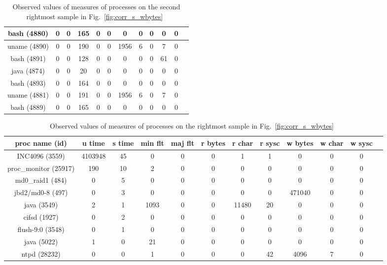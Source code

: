 \begin{table}[h]
\begin{center}
\begin{tabular}{|c|c|c|c|c|c|c|c|c|c|c|c|}
bash (4880) & 0 & 0 & 165 & 0 & 0 & 0 & 0 & 0 & 0 & 0 \\ \hline
uname (4890)  & 0 & 0 & 190 & 0 & 0 & 1956  & 6 & 0 & 7 & 0 \\ \hline
bash (4891) & 0 & 0 & 128 & 0 & 0 & 0 & 0 & 0 & 61 & 0 \\ \hline
java  (4874) & 0 & 0 & 20 & 0 & 0 & 0 & 0 & 0 & 0 & 0 \\ \hline
bash (4893) & 0 & 0 & 164 & 0 & 0 & 0 & 0 & 0 & 0 & 0 \\ \hline
uname (4881)  & 0 & 0 & 191 & 0 & 0 & 1956  & 6 & 0 & 7 & 0 \\ \hline
bash (4889) & 0 & 0 & 165 & 0 & 0 & 0 & 0 & 0 & 0 & 0 \\ \hline
\end{tabular}
\end{center}
\caption{Observed values of measures of processes on the second rightmost sample in Fig.~\ref{fig:corr_s_wbytes}~\label{tab:breakdown5}}
\end{table}

\begin{table}[h]
\begin{center}
\begin{tabular}{|c|c|c|c|c|c|c|c|c|c|c|c|} \hline
proc name (id) & u time & s time & min flt & maj flt & r bytes & r char & r sysc & w bytes & w char & w sysc\\ \hline
INC4096 (3559) & 4103948 & 45 & 0 & 0 & 0 & 1 & 1 & 0 & 0 & 0 \\ \hline
proc\_monitor (25917) & 190 & 10 & 2 & 0 & 0 & 0 & 0 & 0 & 0 & 0 \\ \hline
md0\_raid1 (484) & 0 & 5 & 0 & 0 & 0 & 0 & 0 & 0 & 0 & 0 \\ \hline
jbd2/md0-8 (497) & 0 & 3 & 0 & 0 & 0 & 0 & 0 & 471040 & 0 & 0 \\ \hline
java (3549) & 2 & 1 & 1093 & 0 & 0 & 11480 & 20 & 0 & 0 & 0 \\ \hline
cifsd (1927) & 0 & 2 & 0 & 0 & 0 & 0 & 0 & 0 & 0 & 0 \\ \hline
flush-9:0 (3548) & 0 & 1 & 0 & 0 & 0 & 0 & 0 & 0 & 0 & 0 \\ \hline
java (5022) & 1 & 0 & 21 & 0 & 0 & 0 & 0 & 0 & 0 & 0 \\ \hline
ntpd (28232) & 0 & 0 & 1 & 0 & 0 & 0 & 42 & 4096 & 7 & 0 \\ \hline
\end{tabular}
\end{center}
\caption{Observed values of measures of processes on the rightmost sample in Fig.~\ref{fig:corr_s_wbytes}~\label{tab:breakdown6}}
\end{table}
